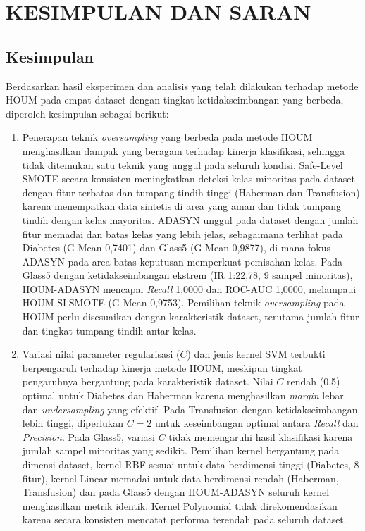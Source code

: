 \newpage
\chapter{KESIMPULAN DAN SARAN} \label{Bab V}

\section{Kesimpulan} \label{V.Kesimpulan}
Berdasarkan hasil eksperimen dan analisis yang telah dilakukan terhadap metode HOUM pada empat dataset dengan tingkat ketidakseimbangan yang berbeda, diperoleh kesimpulan sebagai berikut:
\begin{enumerate}
    \item Penerapan teknik \textit{oversampling} yang berbeda pada metode HOUM menghasilkan dampak yang beragam terhadap kinerja klasifikasi, sehingga tidak ditemukan satu teknik yang unggul pada seluruh kondisi. Safe-Level SMOTE secara konsisten meningkatkan deteksi kelas minoritas pada dataset dengan fitur terbatas dan tumpang tindih tinggi (Haberman dan Transfusion) karena menempatkan data sintetis di area yang aman dan tidak tumpang tindih dengan kelas mayoritas. ADASYN unggul pada dataset dengan jumlah fitur memadai dan batas kelas yang lebih jelas, sebagaimana terlihat pada Diabetes (G-Mean 0,7401) dan Glass5 (G-Mean 0,9877), di mana fokus ADASYN pada area batas keputusan memperkuat pemisahan kelas. Pada Glass5 dengan ketidakseimbangan ekstrem (IR 1:22,78, 9 sampel minoritas), HOUM-ADASYN mencapai \textit{Recall} 1,0000 dan ROC-AUC 1,0000, melampaui HOUM-SLSMOTE (G-Mean 0,9753). Pemilihan teknik \textit{oversampling} pada HOUM perlu disesuaikan dengan karakteristik dataset, terutama jumlah fitur dan tingkat tumpang tindih antar kelas.

    \item Variasi nilai parameter regularisasi ($C$) dan jenis kernel SVM terbukti berpengaruh terhadap kinerja metode HOUM, meskipun tingkat pengaruhnya bergantung pada karakteristik dataset. Nilai $C$ rendah (0,5) optimal untuk Diabetes dan Haberman karena menghasilkan \textit{margin} lebar dan \textit{undersampling} yang efektif. Pada Transfusion dengan ketidakseimbangan lebih tinggi, diperlukan $C=2$ untuk keseimbangan optimal antara \textit{Recall} dan \textit{Precision}. Pada Glass5, variasi $C$ tidak memengaruhi hasil klasifikasi karena jumlah sampel minoritas yang sedikit. Pemilihan kernel bergantung pada dimensi dataset, kernel RBF sesuai untuk data berdimensi tinggi (Diabetes, 8 fitur), kernel Linear memadai untuk data berdimensi rendah (Haberman, Transfusion) dan pada Glass5 dengan HOUM-ADASYN seluruh kernel menghasilkan metrik identik. Kernel Polynomial tidak direkomendasikan karena secara konsisten mencatat performa terendah pada seluruh dataset.
\end{enumerate}

